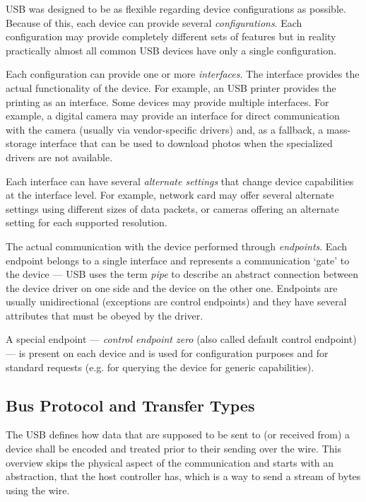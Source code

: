 USB was designed to be as flexible regarding device configurations as possible.
Because of this, each device can provide several \textit{configurations}. Each
configuration may provide completely different sets of features but in reality
practically almost all common USB devices have only a single configuration.

Each configuration can provide one or more \textit{interfaces}. The interface
provides the actual functionality of the device. For example, an USB printer
provides the printing as an interface. Some devices may provide multiple
interfaces. For example, a digital camera may provide an interface for direct
communication with the camera (usually via vendor-specific drivers) and, as a
fallback, a mass-storage interface that can be used to download photos when the
specialized drivers are not available.

Each interface can have several \textit{alternate settings} that change device
capabilities at the interface level. For example, network card may offer
several alternate settings using different sizes of data packets, or cameras
offering an alternate setting for each supported resolution.

The actual communication with the device performed through \textit{endpoints}.
Each endpoint belongs to a single interface and represents a communication
‘gate’ to the device — USB uses the term \textit{pipe} to describe an abstract
connection between the device driver on one side and the device on the other
one. Endpoints are usually unidirectional (exceptions are control endpoints)
and they have several attributes that must be obeyed by the driver.

A special endpoint — \textit{control endpoint zero} (also called default
control endpoint) — is present on each device and is used for configuration
purposes and for standard requests (e.g. for querying the device for
generic capabilities).

\subsection{Bus Protocol and Transfer Types}

The USB defines how data that are supposed to be sent to (or received from) a
device shall be encoded and treated prior to their sending over the wire. This
overview skips the physical aspect of the communication and starts with an
abstraction, that the host controller has, which is a way to send a stream of
bytes using the wire.

